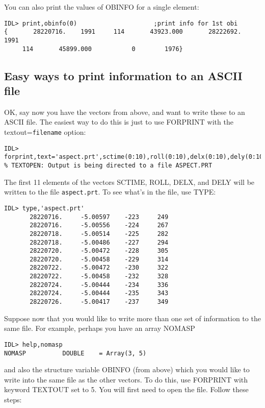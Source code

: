You can also print the values of OBINFO for a single element:

\medskip\noindent
\begin{verbatim}
IDL> print,obinfo(0)                     ;print info for 1st obi
{       28220716.    1991     114       43923.000       28222692.    1991
     114       45899.000           0        1976}
\end{verbatim}
 

\subsection{Easy ways to print information to an ASCII file}
 
OK, say now you have the vectors from above, and want to write these to an
ASCII file. The easiest way to do this is just to use FORPRINT with the
textout={\tt filename} option:

\medskip\noindent
\begin{verbatim}
IDL> forprint,text='aspect.prt',sctime(0:10),roll(0:10),delx(0:10),dely(0:10)
% TEXTOPEN: Output is being directed to a file ASPECT.PRT
\end{verbatim}
The first 11 elements of the vectors SCTIME, ROLL, DELX, and DELY will be
written to the file {\tt aspect.prt}. To see what's in the file, use TYPE:

\medskip\noindent
\begin{verbatim}
IDL> type,'aspect.prt'
       28220716.     -5.00597    -223     249
       28220716.     -5.00556    -224     267
       28220718.     -5.00514    -225     282
       28220718.     -5.00486    -227     294
       28220720.     -5.00472    -228     305
       28220720.     -5.00458    -229     314
       28220722.     -5.00472    -230     322
       28220722.     -5.00458    -232     328
       28220724.     -5.00444    -234     336
       28220724.     -5.00444    -235     343
       28220726.     -5.00417    -237     349
\end{verbatim}
Suppose now that you would like to write more than one set of information to
the same file. For example, perhaps you have an array NOMASP

\medskip\noindent
\begin{verbatim}
IDL> help,nomasp
NOMASP          DOUBLE    = Array(3, 5)
\end{verbatim}
and also the structure variable OBINFO (from above) which you would like to
write into the same file as the other vectors. To do this, use FORPRINT with
keyword TEXTOUT set to 5. You will first need to open the file. Follow these
steps:


